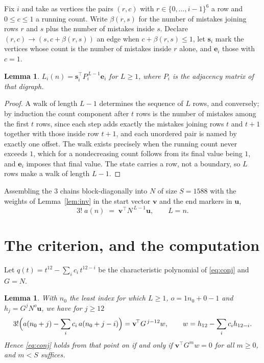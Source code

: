 \documentclass[11pt,a4paper]{article}
\theoremstyle{plain}
\newtheorem{lemma}[theorem]{Lemma}
\theoremstyle{definition}
\begin{document}
Fix $i$ and take as vertices the pairs $(r,c)$ with $r\in\{0,\dots,i-1\}^{6}$ a row
and $0\le c\le1$ a running count. Write $\beta(r,s)$ for the number of mistakes joining
rows $r$ and $s$ plus the number of mistakes inside $s$. Declare $(r,c)\to(s,c+\beta(r,s))$
an edge when $c+\beta(r,s)\le1$, let $\mathbf{s}_i$ mark the vertices whose count is the
number of mistakes inside $r$ alone, and $\mathbf{e}_i$ those with $c=1$.

\begin{lemma}\label{lem:walk}
$L_i(n)=\mathbf{s}_i^{\!\top}P_i^{\,L-1}\mathbf{e}_i$ for $L\ge1$, where $P_i$ is the
adjacency matrix of that digraph.
\end{lemma}

\begin{proof}
A walk of length $L-1$ determines the sequence of $L$ rows, and conversely; by induction
the count component after $t$ rows is the number of mistakes among the first $t$ rows,
since each step adds exactly the mistakes joining rows $t$ and $t+1$ together with those
inside row $t+1$, and each unordered pair is named by exactly one offset. The walk exists
precisely when the running count never exceeds $1$, which for a nondecreasing count follows
from its final value being $1$, and $\mathbf{e}_i$ imposes that final value. The state
carries a row, not a boundary, so $L$ rows make a walk of length $L-1$.
\end{proof}

Assembling the $3$ chains block-diagonally into $N$ of size $S=1588$ with the weights of
Lemma~\ref{lem:inv} in the start vector $\mathbf{v}$ and the end markers in
$\mathbf{u}$,
\begin{equation}\label{eq:walk2}
3!\;a(n)\;=\;\mathbf{v}^{\!\top}N^{\,L-1}\mathbf{u},\qquad L=n .
\end{equation}

\section{The criterion, and the computation}

Let $q(t)=t^{12}-\sum_i c_i\,t^{12-i}$ be the characteristic polynomial of
\eqref{eq:conj} and $G=N$.

\begin{lemma}\label{lem:crit}
With $n_0$ the least index for which $L\ge1$, $o=1n_0+0-1$ and
$h_j=G^{j}N^{o}\mathbf{u}$, we have for $j\ge12$
\[
3!\Bigl(a(n_0+j)-\sum_i c_i\,a(n_0+j-i)\Bigr)=\mathbf{v}^{\!\top}G^{\,j-12}w,
\qquad w=h_{12}-\sum_i c_ih_{12-i} .
\]
Hence \eqref{eq:conj} holds from that point on if and only if
$\mathbf{v}^{\!\top}G^{m}w=0$ for all $m\ge0$, and $m<S$ suffices.
\end{lemma}
\end{document}
